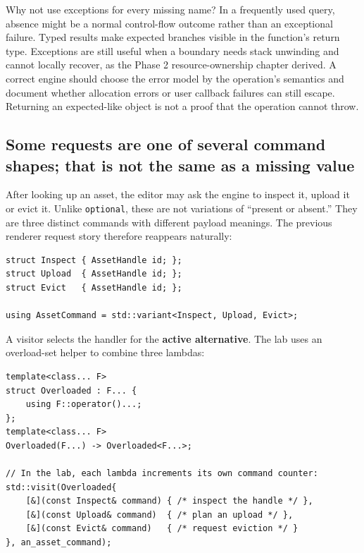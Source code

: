 Why not use exceptions for every missing name? In a frequently used query, absence might be a normal control-flow outcome rather than an exceptional failure. Typed results make expected branches visible in the function's return type. Exceptions are still useful when a boundary needs stack unwinding and cannot locally recover, as the Phase 2 resource-ownership chapter derived. A correct engine should choose the error model by the operation's semantics and document whether allocation errors or user callback failures can still escape. Returning an expected-like object is not a proof that the operation cannot throw.

\subsection{Some requests are one of several command shapes; that is not the same as a missing value}\label{01-foundations-i-ch006-some-requests-are-one-of-several-command-shapes-that-is-not-the-same-as-a-missing-value}

After looking up an asset, the editor may ask the engine to inspect it, upload it or evict it. Unlike \texttt{optional}, these are not variations of ``present or absent.'' They are three distinct commands with different payload meanings. The previous renderer request story therefore reappears naturally:

\begin{verbatim}
struct Inspect { AssetHandle id; };
struct Upload  { AssetHandle id; };
struct Evict   { AssetHandle id; };

using AssetCommand = std::variant<Inspect, Upload, Evict>;
\end{verbatim}

A visitor selects the handler for the \textbf{active alternative}. The lab uses an overload-set helper to combine three lambdas:

\begin{verbatim}
template<class... F>
struct Overloaded : F... {
    using F::operator()...;
};
template<class... F>
Overloaded(F...) -> Overloaded<F...>;

// In the lab, each lambda increments its own command counter:
std::visit(Overloaded{
    [&](const Inspect& command) { /* inspect the handle */ },
    [&](const Upload& command)  { /* plan an upload */ },
    [&](const Evict& command)   { /* request eviction */ }
}, an_asset_command);
\end{verbatim}

